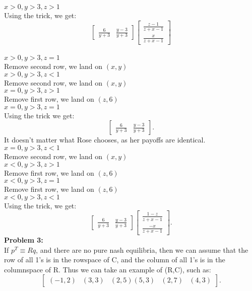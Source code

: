 \documentclass[12pt]{article}
\begin{document}
\noindent
\textbf{$x > 0, y > 3, z > 1$}\\
Using the trick, we get: 
\[
\begin{bmatrix}
	\frac{6}{y+3} & \frac{y-3}{y+3}
\end{bmatrix}
\begin{bmatrix}
	\frac{z-1}{z+x-1} \\
	\frac{x}{z+x-1}
\end{bmatrix}
\] \\
\textbf{$x > 0, y > 3, z = 1$} \\
Remove second row, we land on $(x,y)$\\
\textbf{$x > 0, y > 3, z < 1$} \\
Remove second row, we land on $(x,y)$\\
\textbf{$x = 0, y > 3, z > 1$} \\
Remove first row, we land on $(z,6)$ \\
\textbf{$x = 0, y > 3, z = 1$} \\
Using the trick we get:
\[
\begin{bmatrix}
	\frac{6}{y+3} & \frac{y-3}{y+3}
\end{bmatrix}
.\] It doesn't matter what Rose chooses, as her payoffs are identical.\\
\textbf{$x = 0, y > 3, z < 1$} \\
Remove second row, we land on $(x,y)$ \\
\textbf{$x < 0, y > 3, z > 1$} \\
Remove first row, we land on $(z,6)$ \\
\textbf{$x < 0, y > 3, z = 1$} \\
Remove first row, we land on $(z,6)$ \\
\textbf{$x < 0, y > 3, z < 1$} \\
Using the trick, we get: 
\[
\begin{bmatrix}
	\frac{6}{y+3} & \frac{y-3}{y+3}
\end{bmatrix}
\begin{bmatrix}
	\frac{1-z}{z+x-1} \\
	\frac{-x}{z+x-1}
\end{bmatrix}

.\] 
 \noindent
\textbf{Problem 3: }\\
If $p^{T} \equiv Rq$, and there are no pure nash equilibria, then we can assume that the 
row of all 1's is in the rowspace of C,
and the column of all 1's is in the columnspace of R. Thus we can take an example of (R,C), 
such as:
\[
\begin{bmatrix}
	(-1, 2) & (3, 3) & (2, 5)
	(5, 3) & (2, 7) & (4, 3)
\end{bmatrix}
.\]
\end{document}
